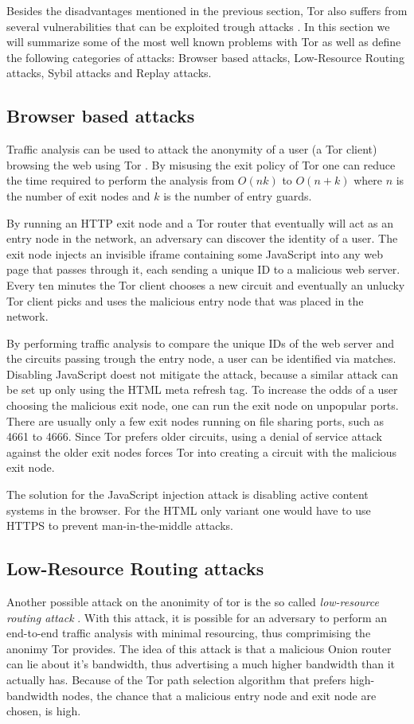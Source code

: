 \documentclass{article}
\begin{document}
	Besides the disadvantages mentioned in the previous section, Tor also suffers from several vulnerabilities that can be exploited trough attacks \cite{abbott2007browser, douceur2002sybil, bauer2007low}. In this section we will summarize some of the most well known problems with Tor as well as define the following categories of attacks: Browser based attacks, Low-Resource Routing attacks, Sybil attacks and Replay attacks.

	\subsection{Browser based attacks}
		Traffic analysis can be used to attack the anonymity of a user (a Tor client) browsing the web using Tor \cite{abbott2007browser}. By misusing the exit policy of Tor one can reduce the time required to perform the analysis from $O(nk)$ to $O(n+k)$ where $n$ is the number of exit nodes and $k$ is the number of entry guards.

		By running an HTTP exit node and a Tor router that eventually will act as an entry node in the network, an adversary can discover the identity of a user. The exit node injects an invisible iframe containing some JavaScript into any web page that passes through it, each sending a unique ID to a malicious web server. Every ten minutes the Tor client chooses a new circuit and eventually an unlucky Tor client picks and uses the malicious entry node that was placed in the network.

		By performing traffic analysis to compare the unique IDs of the web server and the circuits passing trough the entry node, a user can be identified via matches. Disabling JavaScript doest not mitigate the attack, because a similar attack can be set up only using the HTML meta refresh tag. To increase the odds of a user choosing the malicious exit node, one can run the exit node on unpopular ports. There are usually only a few exit nodes running on file sharing ports, such as 4661 to 4666. Since Tor prefers older circuits, using a denial of service attack against the older exit nodes forces Tor into creating a circuit with the malicious exit node.

		The solution for the JavaScript injection attack is disabling active content systems in the browser. For the HTML only variant one would have to use HTTPS to prevent man-in-the-middle attacks.
		
	\subsection{Low-Resource Routing attacks}
		Another possible attack on the anonimity of tor is the so called \emph{low-resource routing attack} \cite{bauer2007low}. With this attack, it is possible for an adversary to perform an end-to-end traffic analysis with minimal resourcing, thus comprimising the anonimy Tor provides. The idea of this attack is that a malicious Onion router can lie about it's bandwidth, thus advertising a much higher bandwidth than it actually has. Because of the Tor path selection algorithm that prefers high-bandwidth nodes, the chance that a malicious entry node and exit node are chosen, is high.
\end{document}
